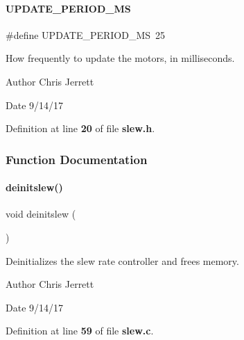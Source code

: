 \mbox{\label{slew_8h_a4e8e7d6fdd1f5c6f8a0f341e4b61f025}} 
\paragraph{U\+P\+D\+A\+T\+E\+\_\+\+P\+E\+R\+I\+O\+D\+\_\+\+MS}
{\footnotesize\ttfamily \#define U\+P\+D\+A\+T\+E\+\_\+\+P\+E\+R\+I\+O\+D\+\_\+\+MS~25}



How frequently to update the motors, in milliseconds. 

\begin{DoxyAuthor}{Author}
Chris Jerrett 
\end{DoxyAuthor}
\begin{DoxyDate}{Date}
9/14/17 
\end{DoxyDate}


Definition at line \textbf{ 20} of file \textbf{ slew.\+h}.



\subsubsection{Function Documentation}
\mbox{\label{slew_8h_a981c9990a969d2587e66e550737f7cd9}} 
\paragraph{deinitslew()}
{\footnotesize\ttfamily void deinitslew (\begin{DoxyParamCaption}{ }\end{DoxyParamCaption})}



Deinitializes the slew rate controller and frees memory. 

\begin{DoxyAuthor}{Author}
Chris Jerrett 
\end{DoxyAuthor}
\begin{DoxyDate}{Date}
9/14/17 
\end{DoxyDate}


Definition at line \textbf{ 59} of file \textbf{ slew.\+c}.



